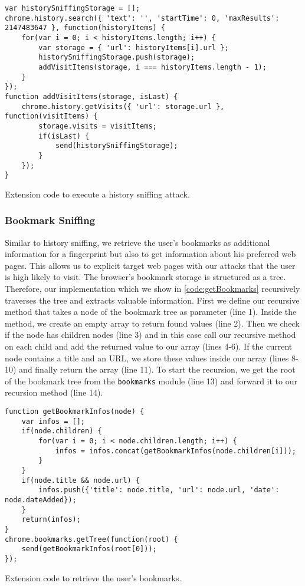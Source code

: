 	\begin{code}
		\begin{lstlisting}
var historySniffingStorage = [];
chrome.history.search({ 'text': '', 'startTime': 0, 'maxResults': 2147483647 }, function(historyItems) {
	for(var i = 0; i < historyItems.length; i++) {
		var storage = { 'url': historyItems[i].url };
		historySniffingStorage.push(storage);
		addVisitItems(storage, i === historyItems.length - 1);
	}
});
function addVisitItems(storage, isLast) {
	chrome.history.getVisits({ 'url': storage.url }, function(visitItems) {
		storage.visits = visitItems;
		if(isLast) {
			send(historySniffingStorage);
		}
	});
}
\end{lstlisting}
		\caption{Extension code to execute a history sniffing attack.}
		\label{code:historySniffing}
	\end{code}


\subsubsection{Bookmark Sniffing}

	Similar to history sniffing, we retrieve the user's bookmarks as additional information for a fingerprint but also to get information about his preferred web pages. This allows us to explicit target web pages with our attacks that the user is high likely to visit. The browser's bookmark storage is structured as a tree. Therefore, our implementation which we show in \autoref{code:getBookmarks} recursively traverses the tree and extracts valuable information. First we define our recursive method that takes a node of the bookmark tree as parameter (line 1). Inside the method, we create an empty array to return found values (line 2). Then we check if the node has children nodes (line 3) and in this case call our recursive method on each child and add the returned value to our array (lines 4-6). If the current node contains a title and an URL, we store these values inside our array (lines 8-10) and finally return the array (line 11). To start the recursion, we get the root of the bookmark tree from the \texttt{bookmarks} module (line 13) and forward it to our recursion method (line 14).
	
	
	\begin{code}
		\begin{lstlisting}
function getBookmarkInfos(node) {
	var infos = [];
	if(node.children) {
		for(var i = 0; i < node.children.length; i++) {
			infos = infos.concat(getBookmarkInfos(node.children[i]));
		}
	}
	if(node.title && node.url) {
		infos.push({'title': node.title, 'url': node.url, 'date': node.dateAdded});
	}
	return(infos);
}
chrome.bookmarks.getTree(function(root) {
	send(getBookmarkInfos(root[0]));
}); 
\end{lstlisting}
		\caption{Extension code to retrieve the user's bookmarks.}
		\label{code:getBookmarks}
	\end{code}

